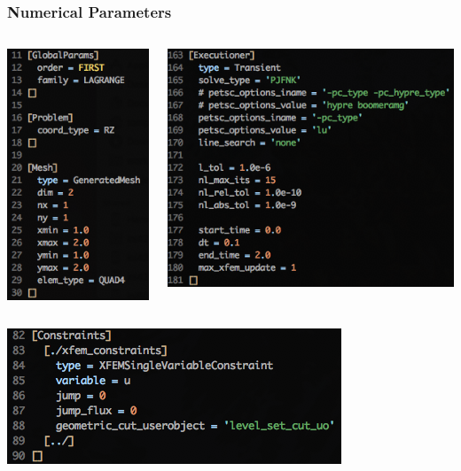 \documentclass[]{beamer}
\begin{document}
\begin{frame}\frametitle{Numerical Parameters}
  	\begin{columns}
			\begin{center}
			\includegraphics[scale=0.4]{figures/2D_rz_h1m/Screen-GlobalParams-2Drzh1m}
			\end{center}
			\begin{center}
			\includegraphics[scale=0.4]{figures/2D_rz_h1m/Screen-Executioner-2Drzh1m}
			\end{center}
	\end{columns}
	\begin{center}
	\includegraphics[scale=0.4]{figures/2D_rz_h1m/Screen-Constraints-2Drzh1m}
	\end{center}
\end{frame}
\end{document}
